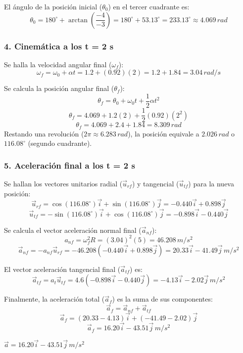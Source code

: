 \documentclass[12pt, a4paper]{article}
\begin{document}
El ángulo de la posición inicial ($\theta_0$) en el tercer cuadrante es:
$$ \theta_0 = 180^\circ + \arctan\left(\frac{-4}{-3}\right) = 180^\circ + 53.13^\circ = 233.13^\circ \approx 4.069 \, \si{rad} $$

\subsubsection*{4. Cinemática a los t = 2 s}
Se halla la velocidad angular final ($\omega_f$):
$$ \omega_f = \omega_0 + \alpha t = 1.2 + (0.92)(2) = 1.2 + 1.84 = 3.04 \, \si{rad/s} $$

Se calcula la posición angular final ($\theta_f$):
$$ \theta_f = \theta_0 + \omega_0 t + \frac{1}{2}\alpha t^2 $$
$$ \theta_f = 4.069 + 1.2(2) + \frac{1}{2}(0.92)(2^2) $$
$$ \theta_f = 4.069 + 2.4 + 1.84 = 8.309 \, \si{rad} $$
Restando una revolución ($2\pi \approx 6.283 \, \si{rad}$), la posición equivale a $2.026 \, \si{rad}$ o $116.08^\circ$ (segundo cuadrante).

\subsubsection*{5. Aceleración final a los t = 2 s}
Se hallan los vectores unitarios radial ($\vec{u}_{rf}$) y tangencial ($\vec{u}_{tf}$) para la nueva posición:
$$ \vec{u}_{rf} = \cos(116.08^\circ)\vec{i} + \sin(116.08^\circ)\vec{j} = -0.440\vec{i} + 0.898\vec{j} $$
$$ \vec{u}_{tf} = -\sin(116.08^\circ)\vec{i} + \cos(116.08^\circ)\vec{j} = -0.898\vec{i} - 0.440\vec{j} $$

Se calcula el vector aceleración normal final ($\vec{a}_{nf}$):
$$ a_{nf} = \omega_f^2 R = (3.04)^2 (5) = 46.208 \, \si{m/s^2} $$
$$ \vec{a}_{nf} = -a_{nf}\vec{u}_{rf} = -46.208(-0.440\vec{i} + 0.898\vec{j}) = 20.33\vec{i} - 41.49\vec{j} \, \si{m/s^2} $$

El vector aceleración tangencial final ($\vec{a}_{tf}$) es:
$$ \vec{a}_{tf} = a_t \vec{u}_{tf} = 4.6(-0.898\vec{i} - 0.440\vec{j}) = -4.13\vec{i} - 2.02\vec{j} \, \si{m/s^2} $$

Finalmente, la aceleración total ($\vec{a}_f$) es la suma de sus componentes:
$$ \vec{a}_f = \vec{a}_{nf} + \vec{a}_{tf} $$
$$ \vec{a}_f = (20.33 - 4.13)\vec{i} + (-41.49 - 2.02)\vec{j} $$
$$ \vec{a}_f = 16.20\vec{i} - 43.51\vec{j} \, \si{m/s^2} $$

\begin{tcolorbox}[colback=green!5!white, colframe=green!50!black, title=Respuesta Final]
\centering \Large $\vec{a} = 16.20\vec{i} - 43.51\vec{j} \, \si{m/s^2}$
\end{tcolorbox}
\end{document}
